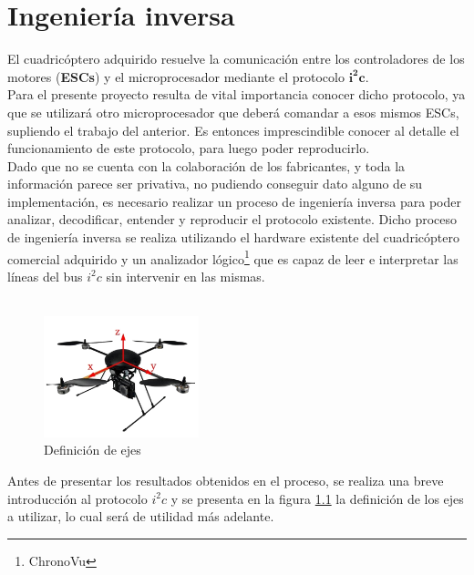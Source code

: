 \documentclass[main]{subfiles}
\begin{document}
\chapter{Ingeniería inversa}

El cuadricóptero adquirido resuelve la comunicación entre los controladores de los motores (\textbf{ESCs}) y el microprocesador mediante el protocolo $\mathbf{i^2c}$.\\

Para el presente proyecto resulta de vital importancia conocer dicho protocolo, ya que se utilizará otro microprocesador que deberá comandar a esos mismos ESCs, supliendo el trabajo del anterior. Es entonces imprescindible conocer al detalle el funcionamiento de este protocolo, para luego poder reproducirlo.\\

Dado que no se cuenta con la colaboración de los fabricantes, y toda la información parece ser privativa, no pudiendo conseguir dato alguno de su implementación, es necesario realizar un proceso de ingeniería inversa para poder analizar, decodificar, entender y reproducir el protocolo existente. Dicho proceso de ingeniería inversa se realiza utilizando el hardware existente del cuadricóptero comercial adquirido y un analizador lógico\footnote{ChronoVu} que es capaz de leer e interpretar las líneas del bus $i^2c$ sin intervenir en las mismas.\\ \\

\begin{figure}
	\vspace{-40pt}
	\begin{center}
	\includegraphics[width=0.4\textwidth]{./pics_sniffer/ejes_quad.jpg}
	\end{center}
	\vspace{-20pt}
	\caption{Definición de ejes}
	\label{fig:ejes_quad}
	\vspace{-70pt}
\end{figure}

Antes de presentar los resultados obtenidos en el proceso, se realiza una breve introducción al protocolo $i^2c$ y se presenta en la figura \ref{fig:ejes_quad} la definición de los ejes a utilizar, lo cual será de utilidad más adelante.
\end{document}

